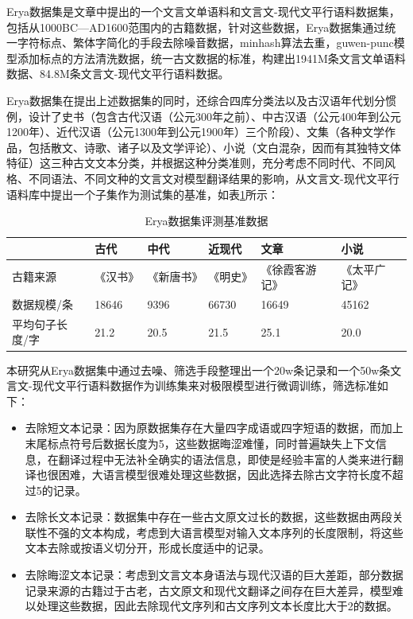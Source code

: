 \documentclass[
    decl-page,  %
    ,fontset = win, %
  ]{njuthesis}
\begin{document}
Erya数据集是文章\cite{guo2023towards}中提出的一个文言文单语料和文言文-现代文平行语料数据集，包括从1000BC—AD1600范围内的古籍数据，针对这些数据，Erya数据集通过统一字符标点、繁体字简化的手段去除噪音数据，minhash算法去重，guwen-punc模型添加标点的方法清洗数据，统一古文数据的标准，构建出1941M条文言文单语料数据、84.8M条文言文-现代文平行语料数据。

Erya数据集在提出上述数据集的同时，还综合四库分类法以及古汉语年代划分惯例，设计了史书（包含古代汉语（公元300年之前）、中古汉语（公元400年到公元1200年）、近代汉语（公元1300年到公元1900年）三个阶段）、文集（各种文学作品，包括散文、诗歌、诸子以及文学评论）、小说（文白混杂，因而有其独特文体特征）这三种古文文本分类，并根据这种分类准则，充分考虑不同时代、不同风格、不同语法、不同文种的文言文对模型翻译结果的影响，从文言文-现代文平行语料库中提出一个子集作为测试集的基准，如表\ref{Erya数据集评测基准数据}所示：

\begin{table}[]
\renewcommand\arraystretch{1.5}
\caption{Erya数据集评测基准数据}
\label{Erya数据集评测基准数据}
\begin{tabular}{|l|l|l|l|l|l|}
\hline
         & 古代    & 中代    & 近现代   & 文章      & 小说     \\ \hline
古籍来源     & 《汉书》  & 《新唐书》 & 《明史》  & 《徐霞客游记》 & 《太平广记》 \\ \hline
数据规模/条   & 18646 & 9396  & 66730 & 16649   & 45162  \\ \hline
平均句子长度/字 & 21.2  & 20.5  & 21.5  & 25.1  & 20.0   \\ \hline
\end{tabular}
\end{table}

本研究从Erya数据集中通过去噪、筛选手段整理出一个20w条记录和一个50w条文言文-现代文平行语料数据作为训练集来对极限模型进行微调训练，筛选标准如下：

\begin{itemize}
    \item 去除短文本记录：因为原数据集存在大量四字成语或四字短语的数据，而加上末尾标点符号后数据长度为5，这些数据晦涩难懂，同时普遍缺失上下文信息，在翻译过程中无法补全确实的语法信息，即使是经验丰富的人类来进行翻译也很困难，大语言模型很难处理这些数据，因此选择去除古文字符长度不超过5的记录。
    \item 去除长文本记录：数据集中存在一些古文原文过长的数据，这些数据由两段关联性不强的文本构成，考虑到大语言模型对输入文本序列的长度限制，将这些文本去除或按语义切分开，形成长度适中的记录。
    \item 去除晦涩文本记录：考虑到文言文本身语法与现代汉语的巨大差距，部分数据记录来源的古籍过于古老，古文原文和现代文翻译之间存在巨大差异，模型难以处理这些数据，因此去除现代文序列和古文序列文本长度比大于2的数据。
\end{itemize}
\end{document}
